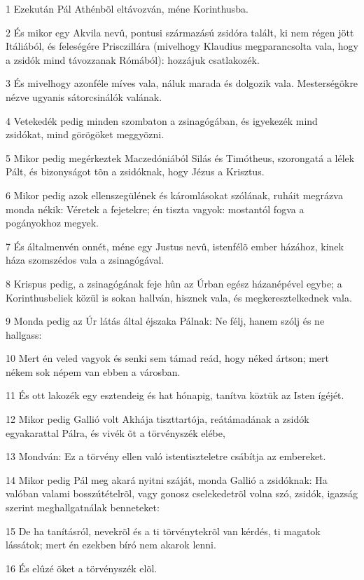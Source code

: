 \par 1 Ezekután Pál Athénbõl eltávozván, méne Korinthusba.
\par 2 És mikor egy Akvila nevû, pontusi származású zsidóra talált, ki nem régen jött Itáliából, és feleségére Prisczillára (mivelhogy Klaudius megparancsolta vala, hogy a zsidók mind távozzanak Rómából): hozzájuk csatlakozék.
\par 3 És mivelhogy azonféle míves vala, náluk marada és dolgozik vala. Mesterségökre nézve ugyanis sátorcsinálók valának.
\par 4 Vetekedék pedig minden szombaton a zsinagógában, és igyekezék mind zsidókat, mind görögöket meggyõzni.
\par 5 Mikor pedig megérkeztek Maczedóniából Silás és Timótheus, szorongatá a lélek Pált, és bizonyságot tõn a zsidóknak, hogy Jézus a Krisztus.
\par 6 Mikor pedig azok ellenszegülének és káromlásokat szólának, ruháit megrázva monda nékik: Véretek a fejetekre;  én tiszta vagyok: mostantól fogva a pogányokhoz  megyek.
\par 7 És általmenvén onnét, méne egy Justus nevû, istenfélõ ember házához, kinek háza szomszédos vala a zsinagógával.
\par 8 Krispus pedig, a zsinagógának feje hûn az Úrban egész házanépével egybe; a Korinthusbeliek közül is sokan hallván, hisznek vala, és megkeresztelkednek vala.
\par 9 Monda pedig az Úr látás által éjszaka Pálnak: Ne félj, hanem szólj és ne hallgass:
\par 10 Mert én veled vagyok és senki sem támad reád, hogy néked ártson; mert nékem sok népem van ebben a városban.
\par 11 És ott lakozék egy esztendeig és hat hónapig, tanítva köztük az Isten ígéjét.
\par 12 Mikor pedig Gallió volt Akhája tiszttartója, reátámadának a zsidók egyakarattal Pálra, és vivék õt a törvényszék elébe,
\par 13 Mondván: Ez a törvény ellen való istentiszteletre csábítja az embereket.
\par 14 Mikor pedig Pál meg akará nyitni száját, monda Gallió a zsidóknak: Ha valóban valami bosszútételrõl, vagy gonosz cselekedetrõl volna szó, zsidók, igazság szerint meghallgatnálak benneteket:
\par 15 De ha tanításról, nevekrõl és a ti törvénytekrõl van kérdés, ti magatok lássátok; mert én ezekben bíró nem akarok lenni.
\par 16 És elûzé õket a törvényszék elõl.
